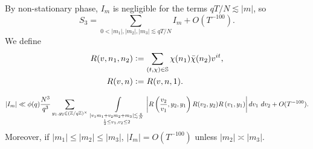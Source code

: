 By non-stationary phase, $I_m$ is negligible for the terms $qT/N\lesssim |m|$, so 
\begin{equation}
    S_3 = \sum_{0<|m_1|,|m_2|,|m_3|\lesssim qT/N} I_m + O(T^{-100}).
\end{equation}
We define \begin{align*}
    R(v,n_1,n_2)&\mathrel{\mathop:}= \sum_{(t,\chi)\in \mathbb{S}} 
    \chi({n_1})\bar{\chi}(n_2)v^{it},\\
    R(v,n)&\mathrel{\mathop:}= R(v,n,1).
\end{align*}
\begin{proposition}
    \label{doubleintegrals3}
    \[
    |I_m|\ll \phi(q) \frac{N^3}{q^3}  
    \sum_{y_1,y_2\in (\mathbb{Z}/q\mathbb{Z})^\times}\ \int\displaylimits_{\substack{
        |v_1m_1+v_2m_2+m_3|\lesssim \frac{q}{N}\\
        \frac{1}{2}\leq v_1,v_2\leq 2
    }} \left| R\left(\frac{v_2}{v_1},y_2,y_1\right)
    R(v_2,y_2)R\left(v_1,y_1\right)\right| dv_1 \ dv_2  + O(T^{-100}).\\
    \]
    Moreover, if $|m_1|\leq|m_2|\leq |m_3|$, $|I_m|=O(T^{-100})$ unless $|m_2|\asymp|m_3|$.
\end{proposition}
